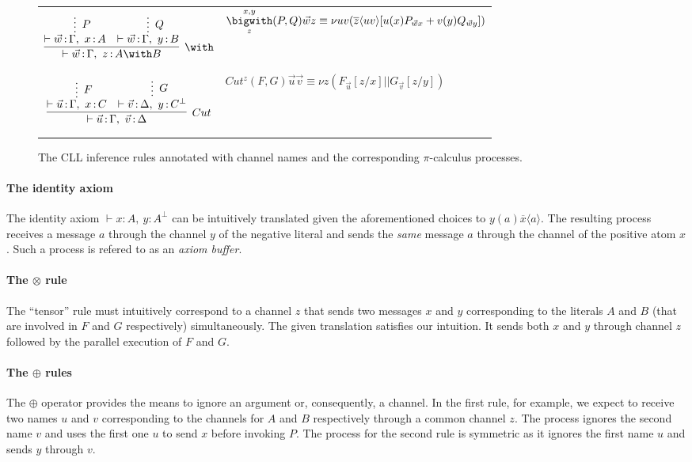 \documentclass[copyright,creativecommons]{eptcs}
\DeclareMathOperator{\cln}{:}
\begin{document}
\begin{figure}[htb]
\begin{tabular}{>{\centering\arraybackslash}m{.4\linewidth} >{\centering\arraybackslash}m{.55\linewidth}}
		\vspace*{-7mm}
		$$
		\infer[\with]{\vdash \vec{w} \cln \Gamma,\ z \cln A\with B}{
		\infer*[P]{\vdash \vec{w} \cln \Gamma,\ x \cln A}{}
		&
		\infer*[Q]{\vdash \vec{w} \cln \Gamma,\ y \cln B}{}
		}
		$$ & 
		$\overset{x,y}{\underset{z}{\bigwith}}(P,Q)\vec{w}z \equiv \nu u v (\overline{z}\langle uv \rangle[u(x)P_{\vec{w}x} + v(y)Q_{\vec{w}y}])$ \\
		\vspace*{-7mm}
		$$
		\infer[Cut]{\vdash \vec{u} \cln \Gamma,\ \vec{v} \cln \Delta}{
		\infer*[F]{\vdash \vec{u} \cln \Gamma,\ x \cln C}{}
		&
		\infer*[G]{\vdash \vec{v} \cln \Delta,\ y \cln C^\bot}{}
		}
		$$ & 
		$Cut^{z}(F,G)\vec{u}\vec{v} \equiv \nu z (F_{\vec{u}}[z/x] || G_{\vec{v}}[z/y])$ \\
		\end{tabular}
			\caption{The CLL inference rules annotated with channel names and the corresponding $\pi$-calculus processes.}
			\label{CLLpi}
\end{figure}

\paragraph{The identity axiom} The identity axiom $\vdash x \cln A,\ y \cln A^\bot$ can be intuitively translated given the aforementioned choices to $y(a)\overline{x}\langle a \rangle$. The resulting process receives a message $a$ through the channel $y$ of the negative literal and sends the \textit{same} message $a$ through the channel of the positive atom $x$. Such a process is refered to as an \textit{axiom buffer}.

\paragraph{The $\otimes$ rule} The ``tensor'' rule must intuitively correspond to a channel $z$ that sends two messages $x$ and $y$ corresponding to the literals $A$ and $B$ (that are involved in $F$ and $G$ respectively) simultaneously. The given translation satisfies our intuition. It sends both $x$ and $y$ through channel $z$ followed by the parallel execution of $F$ and $G$.


\paragraph{The $\oplus$ rules} The $\oplus$ operator provides the means to ignore an argument or, consequently, a channel. In the first rule, for example, we expect to receive two names $u$ and $v$ corresponding to the channels for $A$ and $B$ respectively through a common channel $z$. The process ignores the second name $v$ and uses the first one $u$ to send $x$ before invoking $P$. The process for the second rule is symmetric as it ignores the first name $u$ and sends $y$ through $v$. 
\end{document}
